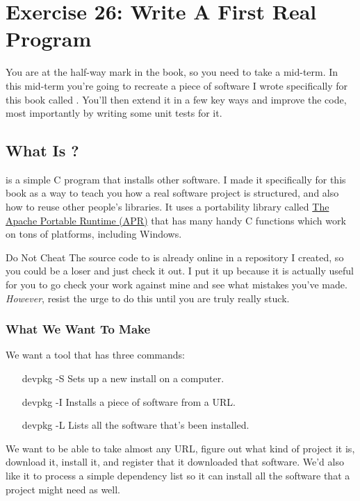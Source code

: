 \chapter{Exercise 26: Write A First Real Program}

You are at the half-way mark in the book, so you need to take a 
mid-term.  In this mid-term you're going to recreate a piece
of software I wrote specifically for this book called .
You'll then extend it in a few key ways and improve the code, most
importantly by writing some unit tests for it.

\section{What Is ?}

 is a simple C program that installs other software.  I
made it specifically for this book as a way to teach you how a real 
software project is structured, and also how to reuse other people's
libraries.  It uses a portability library called \href{http://apr.apache.org/}{The
Apache Portable Runtime (APR)} that has many handy C functions which
work on tons of platforms, including Windows.

\begin{aside}{Do Not Cheat}
The source code to  is already online in a repository
I created, so you could be a loser and just check it out.  I put it up
because it is actually useful for you to go check your work against
mine and see what mistakes you've made.  \emph{However}, resist the
urge to do this until you are truly really stuck.
\end{aside}

\subsection{What We Want To Make}

We want a tool that has three commands:

\begin{enumerate}
\item[devpkg -S] Sets up a new install on a computer.
\item[devpkg -I] Installs a piece of software from a URL.
\item[devpkg -L] Lists all the software that's been installed.
\end{enumerate}

We want  to be able to take almost any URL, figure
out what kind of project it is, download it, install it, and register
that it downloaded that software.  We'd also like it to process a
simple dependency list so it can install all the software that a
project might need as well.

